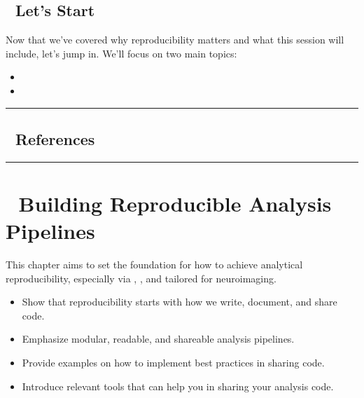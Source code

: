 \documentclass[letterpaper,10pt,english]{jupyterBook}
\begin{document}
\section{🚩 Let’s Start}
\label{\detokenize{chapters/01/reproducibility-in-neuroimaging:let-s-start}}
\sphinxAtStartPar
Now that we’ve covered why reproducibility matters and what this session will include, let’s jump in.
We’ll focus on two main topics:
\begin{itemize}
\item {} 
\sphinxAtStartPar
{}

\item {} 
\sphinxAtStartPar
{}

\end{itemize}


\bigskip\hrule\bigskip



\section{📑 References}
\label{\detokenize{chapters/01/reproducibility-in-neuroimaging:references}}

\bigskip\hrule\bigskip


\sphinxstepscope


\chapter{📘 Building Reproducible Analysis Pipelines}
\label{\detokenize{chapters/02/reproducible-analysis-pipelines:building-reproducible-analysis-pipelines}}\label{\detokenize{chapters/02/reproducible-analysis-pipelines::doc}}
\sphinxAtStartPar
This chapter aims to set the foundation for how to achieve analytical reproducibility, especially via , , and  tailored for neuroimaging.

\sphinxAtStartPar
{}
\begin{itemize}
\item {} 
\sphinxAtStartPar
Show that reproducibility starts with how we write, document, and share code.

\item {} 
\sphinxAtStartPar
Emphasize modular, readable, and shareable analysis pipelines.

\item {} 
\sphinxAtStartPar
Provide examples on how to implement best practices in sharing code.

\item {} 
\sphinxAtStartPar
Introduce relevant tools that can help you in sharing your analysis code.

\end{itemize}
\end{document}
